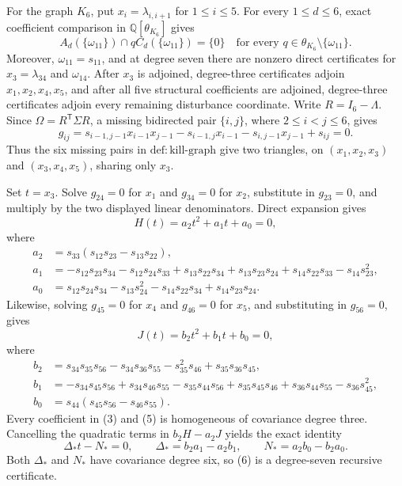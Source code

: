 For the graph \(K_6\), put \(x_i=\lambda_{i,i+1}\) for \(1\leq i\leq5\).  For every \(1\leq d\leq6\), exact coefficient comparison in \(\mathbb Q[\theta_{K_6}]\) gives
\[
 A_d(\{\omega_{11}\})\cap qC_d(\{\omega_{11}\})=\{0\}
 \quad\text{for every }q\in\theta_{K_6}\setminus\{\omega_{11}\}.
\]
Moreover, \(\omega_{11}=s_{11}\), and at degree seven there are nonzero direct certificates for \(x_3=\lambda_{34}\) and \(\omega_{14}\).  After \(x_3\) is adjoined, degree-three certificates adjoin \(x_1,x_2,x_4,x_5\), and after all five structural coefficients are adjoined, degree-three certificates adjoin every remaining disturbance coordinate.
Write \(R=I_6-\Lambda\).  Since \(\Omega=R^{\mathsf T}\Sigma R\), a missing bidirected pair \(\{i,j\}\), where \(2\leq i<j\leq6\), gives
\[
 g_{ij}=s_{i-1,j-1}x_{i-1}x_{j-1}-s_{i-1,j}x_{i-1}
          -s_{i,j-1}x_{j-1}+s_{ij}=0. \tag{1}
\]
Thus the six missing pairs in \(\mathrm{def:kill\mbox{-}graph}\) give two triangles, on \((x_1,x_2,x_3)\) and \((x_3,x_4,x_5)\), sharing only \(x_3\).

Set \(t=x_3\).  Solve \(g_{24}=0\) for \(x_1\) and \(g_{34}=0\) for \(x_2\), substitute in \(g_{23}=0\), and multiply by the two displayed linear denominators.  Direct expansion gives
\[
 H(t)=a_2t^2+a_1t+a_0=0, \tag{2}
\]
where
\[
\begin{aligned}
 a_2&=s_{33}(s_{12}s_{23}-s_{13}s_{22}),\\
 a_1&=-s_{12}s_{23}s_{34}-s_{12}s_{24}s_{33}
       +s_{13}s_{22}s_{34}+s_{13}s_{23}s_{24}
       +s_{14}s_{22}s_{33}-s_{14}s_{23}^{2},\\
 a_0&=s_{12}s_{24}s_{34}-s_{13}s_{24}^{2}
       -s_{14}s_{22}s_{34}+s_{14}s_{23}s_{24}.
\end{aligned} \tag{3}
\]
Likewise, solving \(g_{45}=0\) for \(x_4\) and \(g_{46}=0\) for \(x_5\), and substituting in \(g_{56}=0\), gives
\[
 J(t)=b_2t^2+b_1t+b_0=0, \tag{4}
\]
where
\[
\begin{aligned}
 b_2&=s_{34}s_{35}s_{56}-s_{34}s_{36}s_{55}
       -s_{35}^{2}s_{46}+s_{35}s_{36}s_{45},\\
 b_1&=-s_{34}s_{45}s_{56}+s_{34}s_{46}s_{55}
       -s_{35}s_{44}s_{56}+s_{35}s_{45}s_{46}
       +s_{36}s_{44}s_{55}-s_{36}s_{45}^{2},\\
 b_0&=s_{44}(s_{45}s_{56}-s_{46}s_{55}).
\end{aligned} \tag{5}
\]
Every coefficient in (3) and (5) is homogeneous of covariance degree three.  Cancelling the quadratic terms in \(b_2H-a_2J\) yields the exact identity
\[
 \Delta_{\!*}t-N_{\!*}=0,\qquad
 \Delta_{\!*}=b_2a_1-a_2b_1,\qquad
 N_{\!*}=a_2b_0-b_2a_0. \tag{6}
\]
Both \(\Delta_{\!*}\) and \(N_{\!*}\) have covariance degree six, so (6) is a degree-seven recursive certificate.

